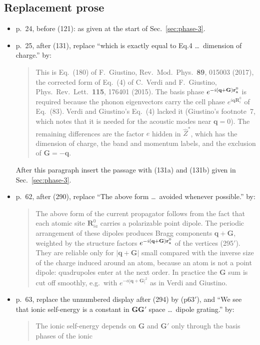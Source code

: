\documentclass[11pt]{article}
\begin{document}
\subsection{Replacement prose}\label{sec:phase-prose}
\begin{itemize}
\item p.~24, before (121): as given at the start of Sec.~\ref{sec:phase-3}.
\item p.~25, after (131), replace ``which is exactly equal to Eq.4 \ldots\ dimension of charge.'' by:
\begin{quote}
This is Eq.~(180) of F.~Giustino, Rev.\ Mod.\ Phys.\ \textbf{89}, 015003 (2017), the corrected form of
Eq.~(4) of C.~Verdi and F.~Giustino, Phys.\ Rev.\ Lett.\ \textbf{115}, 176401 (2015). The basis phase
$e^{-i(\mathbf q+\mathbf G)\mathbf r^0_{\rm a}}$ is required because the phonon eigenvectors carry the cell
phase $e^{i\mathbf q\mathbf R^0_i}$ of Eq.~(83). Verdi and Giustino's Eq.~(4) lacked it (Giustino's
footnote~7, which notes that it is needed for the acoustic modes near $\mathbf q=0$). The remaining
differences are the factor $e$ hidden in $\hat Z^*$, which has the dimension of charge, the band and
momentum labels, and the exclusion of $\mathbf G=-\mathbf q$.
\end{quote}
After this paragraph insert the passage with (131a) and (131b) given in Sec.~\ref{sec:phase-3}.
\item p.~62, after (290), replace ``The above form \ldots\ avoided whenever possible.'' by:
\begin{quote}
The above form of the current propagator follows from the fact that each atomic site $\mathbf R^0_{ia}$
carries a polarizable point dipole. The periodic arrangement of these dipoles produces Bragg components
$\mathbf q+\mathbf G$, weighted by the structure factors $e^{-i(\mathbf q+\mathbf G)\mathbf r^0_{\rm a}}$ of the
vertices (295$'$). They are reliable only for $|\mathbf q+\mathbf G|$ small compared with the inverse size of
the charge induced around an atom, because an atom is not a point dipole: quadrupoles enter at the next
order. In practice the $\mathbf G$ sum is cut off smoothly, e.g.\ with $e^{-a|\mathbf q+\mathbf G|^2}$ as in
Verdi and Giustino.
\end{quote}
\item p.~63, replace the unnumbered display after (294) by (p63$'$), and ``We see that ionic self-energy is
a constant in $\mathbf G\mathbf G'$ space \ldots\ dipole grating.'' by:
\begin{quote}
The ionic self-energy depends on $\mathbf G$ and $\mathbf G'$ only through the basis phases of the ionic

\end{quote}
\end{itemize}
\end{document}
